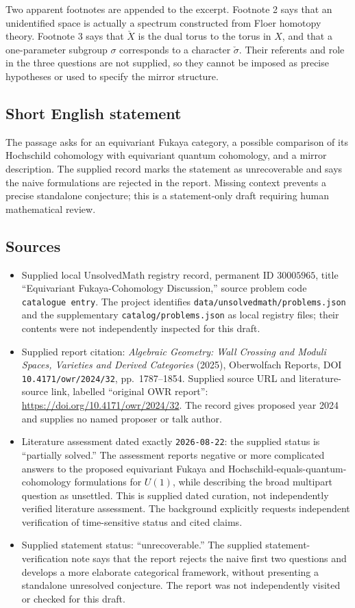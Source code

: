 \documentclass[11pt]{article}
\begin{document}
Two apparent footnotes are appended to the excerpt. Footnote 2 says that an unidentified space is actually a spectrum constructed from Floer homotopy theory. Footnote 3 says that \(\check X\) is the dual torus to the torus in \(X\), and that a one-parameter subgroup \(\sigma\) corresponds to a character \(\check\sigma\). Their referents and role in the three questions are not supplied, so they cannot be imposed as precise hypotheses or used to specify the mirror structure.
\subsection{Short English statement}
The passage asks for an equivariant Fukaya category, a possible comparison of its Hochschild cohomology with equivariant quantum cohomology, and a mirror description. The supplied record marks the statement as unrecoverable and says the naive formulations are rejected in the report. Missing context prevents a precise standalone conjecture; this is a statement-only draft requiring human mathematical review.
\subsection{Sources}
\begin{itemize}
\item Supplied local UnsolvedMath registry record, permanent ID \(30005965\), title ``Equivariant Fukaya-Cohomology Discussion,'' source problem code \texttt{catalogue entry}. The project identifies \texttt{data/unsolvedmath/problems.json} and the supplementary \texttt{catalog/problems.json} as local registry files; their contents were not independently inspected for this draft.
\item Supplied report citation: \emph{Algebraic Geometry: Wall Crossing and Moduli Spaces, Varieties and Derived Categories} (2025), Oberwolfach Reports, DOI \texttt{10.4171/owr/2024/32}, pp.\ 1787--1854. Supplied source URL and literature-source link, labelled ``original OWR report'': \url{https://doi.org/10.4171/owr/2024/32}. The record gives proposed year 2024 and supplies no named proposer or talk author.
\item Literature assessment dated exactly \texttt{2026-08-22}: the supplied status is ``partially solved.'' The assessment reports negative or more complicated answers to the proposed equivariant Fukaya and Hochschild-equals-quantum-cohomology formulations for \(U(1)\), while describing the broad multipart question as unsettled. This is supplied dated curation, not independently verified literature assessment. The background explicitly requests independent verification of time-sensitive status and cited claims.
\item Supplied statement status: ``unrecoverable.'' The supplied statement-verification note says that the report rejects the naive first two questions and develops a more elaborate categorical framework, without presenting a standalone unresolved conjecture. The report was not independently visited or checked for this draft.
\end{itemize}
\end{document}
